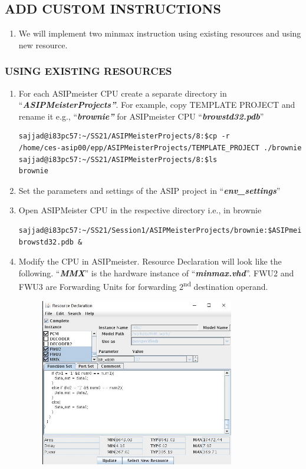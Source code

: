 \subsection{ADD CUSTOM INSTRUCTIONS}
\begin{enumerate}[resume]
\item We will implement two minmax instruction using existing resources and
using new resource.
\end{enumerate}
\subsubsection{USING EXISTING RESOURCES}
\begin{enumerate}[resume]
\item For each ASIPmeister CPU create a separate directory in ``\emph{\textbf{ASIPMeisterProjects''}}. For example, copy TEMPLATE
PROJECT and rename it e.g., ``\emph{\textbf{brownie''}} for
ASIPmeister CPU ``\emph{\textbf{browstd32.pdb}}''
\begin{lstlisting}
sajjad@i83pc57:~/SS21/ASIPMeisterProjects/8:$cp -r
/home/ces-asip00/epp/ASIPMeisterProjects/TEMPLATE_PROJECT ./brownie
sajjad@i83pc57:~/SS21/ASIPMeisterProjects/8:$ls
brownie
\end{lstlisting}
\item
Set the parameters and settings of the ASIP project in
``\emph{\textbf{env\_settings}}''
\item
Open ASIPMeister CPU in the respective directory i.e., in brownie
\begin{lstlisting}
sajjad@i83pc57:~/SS21/Session1/ASIPMeisterProjects/brownie:$ASIPmeister
browstd32.pdb &
\end{lstlisting}
\item Modify the CPU in ASIPmeister. Resource Declaration will look like the
following. ``\emph{\textbf{MMX}}'' is the hardware instance of
``\emph{\textbf{minmax.vhd}}''. FWU2 and FWU3 are Forwarding Units for
forwarding 2\textsuperscript{nd} destination operand.
\begin{figure}[!htb]
	\centering
	\includegraphics[width=0.8\textwidth]{src/images/image1.jpg}

\end{figure}
\end{enumerate}
